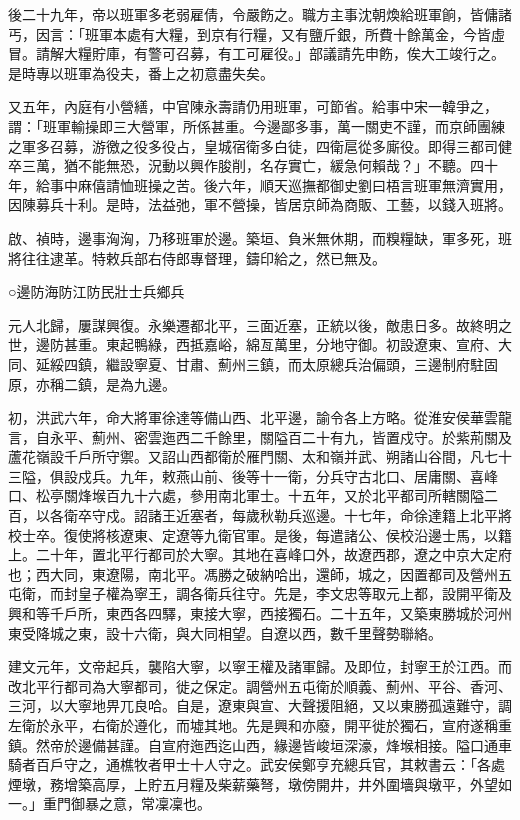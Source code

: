 後二十九年，帝以班軍多老弱雇倩，令嚴飭之。職方主事沈朝煥給班軍餉，皆傭諸丐，因言：「班軍本處有大糧，到京有行糧，又有鹽斤銀，所費十餘萬金，今皆虛冒。請解大糧貯庫，有警可召募，有工可雇役。」部議請先申飭，俟大工竣行之。是時專以班軍為役夫，番上之初意盡失矣。

又五年，內庭有小營繕，中官陳永壽請仍用班軍，可節省。給事中宋一韓爭之，謂：「班軍輸操即三大營軍，所係甚重。今邊鄙多事，萬一關吏不謹，而京師團練之軍多召募，游徼之役多役占，皇城宿衛多白徒，四衛扈從多廝役。即得三都司健卒三萬，猶不能無恐，況動以興作朘削，名存實亡，緩急何賴哉？」不聽。四十年，給事中麻僖請恤班操之苦。後六年，順天巡撫都御史劉曰梧言班軍無濟實用，因陳募兵十利。是時，法益弛，軍不營操，皆居京師為商販、工藝，以錢入班將。

啟、禎時，邊事洶洶，乃移班軍於邊。築垣、負米無休期，而糗糧缺，軍多死，班將往往逮革。特敕兵部右侍郎專督理，鑄印給之，然已無及。

○邊防海防江防民壯士兵鄉兵

元人北歸，屢謀興復。永樂遷都北平，三面近塞，正統以後，敵患日多。故終明之世，邊防甚重。東起鴨綠，西抵嘉峪，綿亙萬里，分地守御。初設遼東、宣府、大同、延綏四鎮，繼設寧夏、甘肅、薊州三鎮，而太原總兵治偏頭，三邊制府駐固原，亦稱二鎮，是為九邊。

初，洪武六年，命大將軍徐達等備山西、北平邊，諭令各上方略。從淮安侯華雲龍言，自永平、薊州、密雲迤西二千餘里，關隘百二十有九，皆置戍守。於紫荊關及蘆花嶺設千戶所守禦。又詔山西都衛於雁門關、太和嶺并武、朔諸山谷間，凡七十三隘，俱設戍兵。九年，敕燕山前、後等十一衛，分兵守古北口、居庸關、喜峰口、松亭關烽堠百九十六處，參用南北軍士。十五年，又於北平都司所轄關隘二百，以各衛卒守戍。詔諸王近塞者，每歲秋勒兵巡邊。十七年，命徐達籍上北平將校士卒。復使將核遼東、定遼等九衛官軍。是後，每遣諸公、侯校沿邊士馬，以籍上。二十年，置北平行都司於大寧。其地在喜峰口外，故遼西郡，遼之中京大定府也；西大同，東遼陽，南北平。馮勝之破納哈出，還師，城之，因置都司及營州五屯衛，而封皇子權為寧王，調各衛兵往守。先是，李文忠等取元上都，設開平衛及興和等千戶所，東西各四驛，東接大寧，西接獨石。二十五年，又築東勝城於河州東受降城之東，設十六衛，與大同相望。自遼以西，數千里聲勢聯絡。

建文元年，文帝起兵，襲陷大寧，以寧王權及諸軍歸。及即位，封寧王於江西。而改北平行都司為大寧都司，徙之保定。調營州五屯衛於順義、薊州、平谷、香河、三河，以大寧地畀兀良哈。自是，遼東與宣、大聲援阻絕，又以東勝孤遠難守，調左衛於永平，右衛於遵化，而墟其地。先是興和亦廢，開平徙於獨石，宣府遂稱重鎮。然帝於邊備甚謹。自宣府迤西迄山西，緣邊皆峻垣深濠，烽堠相接。隘口通車騎者百戶守之，通樵牧者甲士十人守之。武安侯鄭亨充總兵官，其敕書云：「各處煙墩，務增築高厚，上貯五月糧及柴薪藥弩，墩傍開井，井外圍墻與墩平，外望如一。」重門御暴之意，常凜凜也。


